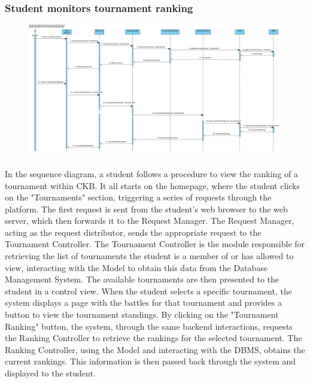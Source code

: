 \subsubsection{Student monitors tournament ranking}
\begin{figure}[H]
    \centering
    \includegraphics[width=1\textwidth]{SequenceDiagram/StudentMonitorsTournamentRanking.png}
    \label{fig:enter-label}
\end{figure}
In the sequence diagram, a student follows a procedure to view the ranking of a tournament within CKB.
It all starts on the homepage, where the student clicks on the "Tournaments" section, triggering a series of requests through the platform. The first request is sent from the student's web browser to the web server, which then forwards it to the Request Manager. The Request Manager, acting as the request distributor, sends the appropriate request to the Tournament Controller.
The Tournament Controller is the module responsible for retrieving the list of tournaments the student is a member of or has allowed to view, interacting with the Model to obtain this data from the Database Management System. The available tournaments are then presented to the student in a control view.
When the student selects a specific tournament, the system displays a page with the battles for that tournament and provides a button to view the tournament standings. By clicking on the "Tournament Ranking" button, the system, through the same backend interactions, requests the Ranking Controller to retrieve the rankings for the selected tournament.
The Ranking Controller, using the Model and interacting with the DBMS, obtains the current rankings. This information is then passed back through the system and displayed to the student.

